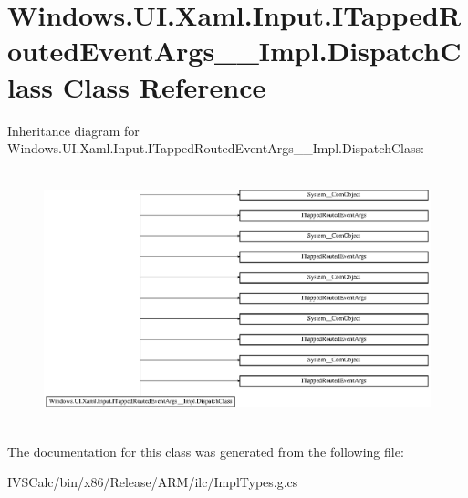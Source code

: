 \hypertarget{class_windows_1_1_u_i_1_1_xaml_1_1_input_1_1_i_tapped_routed_event_args_____impl_1_1_dispatch_class}{}\section{Windows.\+U\+I.\+Xaml.\+Input.\+I\+Tapped\+Routed\+Event\+Args\+\_\+\+\_\+\+Impl.\+Dispatch\+Class Class Reference}
\label{class_windows_1_1_u_i_1_1_xaml_1_1_input_1_1_i_tapped_routed_event_args_____impl_1_1_dispatch_class}
Inheritance diagram for Windows.\+U\+I.\+Xaml.\+Input.\+I\+Tapped\+Routed\+Event\+Args\+\_\+\+\_\+\+Impl.\+Dispatch\+Class\+:\begin{figure}[H]
\begin{center}
\leavevmode
\includegraphics[height=7.421687cm]{class_windows_1_1_u_i_1_1_xaml_1_1_input_1_1_i_tapped_routed_event_args_____impl_1_1_dispatch_class}
\end{center}
\end{figure}


The documentation for this class was generated from the following file\+:\begin{DoxyCompactItemize}
\item 
I\+V\+S\+Calc/bin/x86/\+Release/\+A\+R\+M/ilc/Impl\+Types.\+g.\+cs\end{DoxyCompactItemize}
